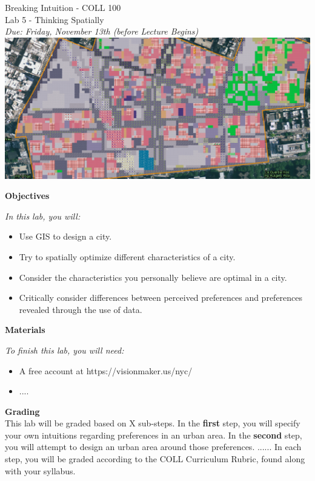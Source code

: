 \documentclass{article}
\begin{document}
\begin{center}
{\Huge Breaking Intuition - COLL 100}\\
\vspace{5mm}
{\huge Lab 5 - Thinking Spatially}\\ %
\vspace{5mm}
\textit{Due: Friday, November 13th (before Lecture Begins)}\\
\vspace{25mm}
\includegraphics[scale=0.65]{Planning.png}
\end{center}



\newpage


\textbf{Objectives}

\textit{In this lab, you will:}
\begin{itemize}
\item Use GIS to design a city. 
\item Try to spatially optimize different characteristics of a city.
\item Consider the characteristics you personally believe are optimal in a city. 
\item Critically consider differences between perceived preferences and preferences revealed through the use of data.
\end{itemize}

\vspace{3mm}
\textbf{Materials}

\textit{To finish this lab, you will need:}
\begin{itemize}
\item A free account at https://visionmaker.us/nyc/
\item ....
\end{itemize}

\vspace{3mm}
\textbf{Grading}\\
This lab will be graded based on X sub-steps.  In the \textbf{first} step, you will specify your own intuitions regarding preferences in an urban area.  In the \textbf{second} step, you will attempt to design an urban area around those preferences.  ......  In each step, you will be graded according to the COLL Curriculum Rubric, found along with your syllabus.
\end{document}
